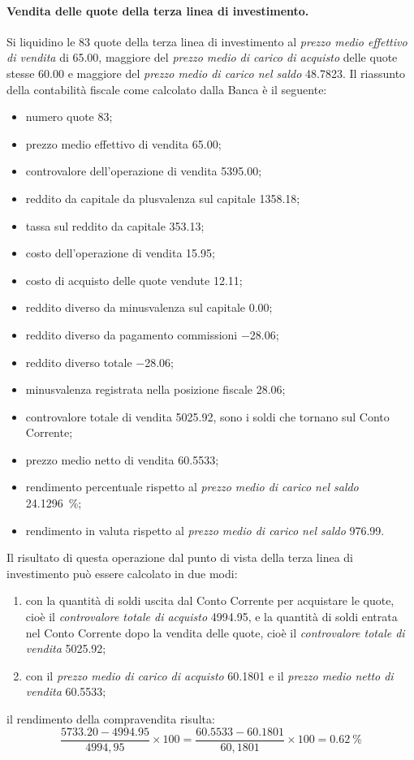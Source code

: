 \documentclass[12pt,a4paper]{article}
\newcommand{\Eur}[1]{\SI{#1}{\text{\euro{}}}}
\newcommand{\CalcoloRendimentoPercentuale}[2]{\frac{\num{#1} - \num{#2}}{#2} \times{} \num{100}}
\newcommand{\PrezzoMedioEffettivoVendita}{\emph{prezzo medio effettivo di vendita}}
\newcommand{\PrezzoMedioCaricoAcquisto}{\emph{prezzo medio di carico di acquisto}}
\newcommand{\PrezzoMedioCaricoSaldo}{\emph{prezzo medio di carico nel saldo}}
\newcommand{\PrezzoMedioNettoVendita}{\emph{prezzo medio netto di vendita}}
\newcommand{\ControvaloreTotaleVendita}{\emph{controvalore totale di vendita}}
\newcommand{\ControvaloreTotaleAcquisto}{\emph{controvalore totale di acquisto}}
\begin{document}
\paragraph{Vendita delle quote della terza linea di investimento.}
Si liquidino le  \num{83} quote della terza linea di  investimento al \PrezzoMedioEffettivoVendita{}
di \Eur{65,00}, maggiore del \PrezzoMedioCaricoAcquisto{}  delle quote stesse \Eur{60,00} e maggiore
del \PrezzoMedioCaricoSaldo{} \Eur{48,7823}.  Il riassunto  della contabilità fiscale come calcolato
dalla Banca è il seguente:
\begin{itemize}
\item numero quote \num{83};
\item prezzo medio effettivo di vendita \Eur{65,00};
\item controvalore dell'operazione di vendita \Eur{5395,00};
\item reddito da capitale da plusvalenza sul capitale \Eur{1358,18};
\item tassa sul reddito da capitale \Eur{353,13};
\item costo dell'operazione di vendita \Eur{15,95};
\item costo di acquisto delle quote vendute \Eur{12,11};
\item reddito diverso da minusvalenza sul capitale \Eur{0,00};
\item reddito diverso da pagamento commissioni \Eur{-28,06};
\item reddito diverso totale \Eur{-28,06};
\item minusvalenza registrata nella posizione fiscale \Eur{28,06};
\item controvalore totale di vendita \Eur{5025,92}, sono i soldi che tornano sul Conto Corrente;
\item prezzo medio netto di vendita \Eur{60,5533};
\item rendimento percentuale rispetto al \PrezzoMedioCaricoSaldo{} {\SI{24,1296}{\percent}};
\item rendimento in valuta rispetto al \PrezzoMedioCaricoSaldo{} \Eur{976,99}.
\end{itemize}
Il risultato di  questa operazione dal punto di  vista della terza linea di  investimento può essere
calcolato in due modi:
\begin{enumerate}
\item  con la  quantità  di  soldi uscita  dal  Conto  Corrente per  acquistare  le  quote, cioè  il
  \ControvaloreTotaleAcquisto{} \Eur{4994,95},  e la  quantità di soldi  entrata nel  Conto Corrente
  dopo la vendita delle quote, cioè il \ControvaloreTotaleVendita{} \Eur{5025,92};
\item   con   il   \PrezzoMedioCaricoAcquisto{}  \Eur{60,1801}   e   il   \PrezzoMedioNettoVendita{}
  \Eur{60,5533};
\end{enumerate}
il rendimento della compravendita risulta:
\begin{equation*}
  \CalcoloRendimentoPercentuale{5733,20}{4994,95} =
  \CalcoloRendimentoPercentuale{60,5533}{60,1801} = \SI{0,62}{\percent}
\end{equation*}
\end{document}
